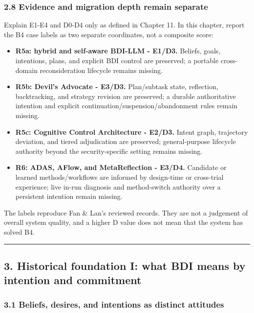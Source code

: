 \subsubsection{2.8 Evidence and migration depth remain separate}\label{evidence-and-migration-depth-remain-separate}

Explain E1-E4 and D0-D4 only as defined in Chapter 11. In this chapter, report the B4 case labels as two separate coordinates, not a composite score:

\begin{itemize}
\tightlist
\item
  \textbf{R5a: hybrid and self-aware BDI-LLM - E1/D3.} Beliefs, goals, intentions, plans, and explicit BDI control are preserved; a portable cross-domain reconsideration lifecycle remains missing.
\item
  \textbf{R5b: Devil's Advocate - E3/D3.} Plan/subtask state, reflection, backtracking, and strategy revision are preserved; a durable authoritative intention and explicit continuation/suspension/abandonment rules remain missing.
\item
  \textbf{R5c: Cognitive Control Architecture - E2/D3.} Intent graph, trajectory deviation, and tiered adjudication are preserved; general-purpose lifecycle authority beyond the security-specific setting remains missing.
\item
  \textbf{R6: ADAS, AFlow, and MetaReflection - E3/D4.} Candidate or learned methods/workflows are informed by design-time or cross-trial experience; live in-run diagnosis and method-switch authority over a persistent intention remain missing.
\end{itemize}

The labels reproduce Fan \& Lan's reviewed records. They are not a judgement of overall system quality, and a higher D value does not mean that the system has solved B4.

\begin{center}\rule{0.5\linewidth}{0.5pt}\end{center}

\subsection{3. Historical foundation I: what BDI means by intention and commitment}\label{historical-foundation-i-what-bdi-means-by-intention-and-commitment}

\subsubsection{3.1 Beliefs, desires, and intentions as distinct attitudes}\label{beliefs-desires-and-intentions-as-distinct-attitudes}

